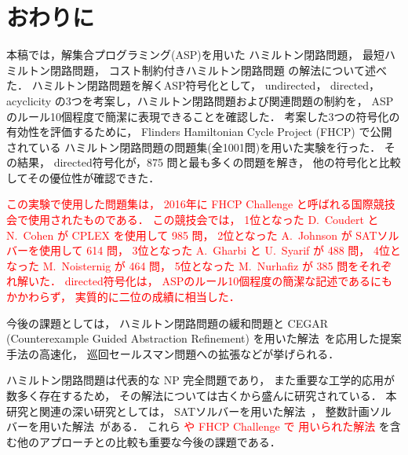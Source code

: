 ﻿%
\section{おわりに}\label{chap:conclusion}

本稿では，解集合プログラミング(ASP)を用いた
ハミルトン閉路問題，
最短ハミルトン閉路問題，
コスト制約付きハミルトン閉路問題
の解法について述べた．
%
ハミルトン閉路問題を解くASP符号化として，
\textsf{undirected}，
\textsf{directed}，
\textsf{acyclicity}
の3つを考案し，ハミルトン閉路問題および関連問題の制約を，
ASPのルール10個程度で簡潔に表現できることを確認した．
%
考案した3つの符号化の有効性を評価するために，
Flinders Hamiltonian Cycle Project (FHCP) で公開されている
ハミルトン閉路問題の問題集(全1001問)を用いた実験を行った．
その結果，
\textsf{directed}符号化が，875 問と最も多くの問題を解き，
他の符号化と比較してその優位性が確認できた．

\textcolor{red}{
  この実験で使用した問題集は，
  2016年に FHCP Challenge と呼ばれる国際競技会で使用されたものである．
  この競技会では，
  1位となった D.~Coudert と N.~Cohen が
  CPLEX を使用して 985 問\cite{cohen17:1001graph}，
  2位となった A.~Johnson が 
  SATソルバーを使用して 614 問\cite{andrew18:triple}，
  3位となった A.~Gharbi と U.~Syarif が 488 問，
  4位となった M.~Noisternig が 464 問，
  5位となった M.~Nurhafiz が 385 問をそれぞれ解いた\cite{haythorpe19:fhcp}．
  \textsf{directed}符号化は，
  ASPのルール10個程度の簡潔な記述であるにもかかわらず，
  実質的に二位の成績に相当した．
}

今後の課題としては，
ハミルトン閉路問題の緩和問題と
CEGAR (Counterexample Guided Abstraction Refinement)
を用いた解法~\cite{soh14:jelia2014,soh20:cegar}を応用した提案手法の高速化，
巡回セールスマン問題への拡張などが挙げられる．

ハミルトン閉路問題は代表的な NP 完全問題であり，
また重要な工学的応用が数多く存在するため，
その解法については古くから盛んに研究されている．
本研究と関連の深い研究としては，
SATソルバーを用いた解法~\cite{Prestwich03:DAM,VelevG09:relative,soh14:jelia2014}，
整数計画ソルバーを用いた解法~\cite{numata11:tsp}がある．
これら
\textcolor{red}{
  や FHCP Challenge で 用いられた解法
}
を含む他のアプローチとの比較も重要な今後の課題である．


